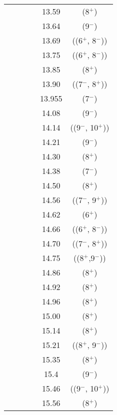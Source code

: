 \begin{center}
\begin{longtable}{cc cc cc}
  &   &   &   & 13.59 & (8$^+$)                   \\
  &   &   &   & 13.64 & (9$^-$)                   \\
  &   &   &   & 13.69 & ((6$^+$, 8$^-$))          \\
  &   &   &   & 13.75 & ((6$^+$, 8$^-$))          \\
  &   &   &   & 13.85 & (8$^+$)                   \\
  &   &   &   & 13.90 & ((7$^-$, 8$^+$))          \\
  &   &   &   & 13.955  & (7$^-$)                   \\
  &   &   &   & 14.08 &   (9$^-$)                 \\
  &   &   &   & 14.14 &   ((9$^-$, 10$^+$))       \\
  &   &   &   & 14.21 &   (9$^-$)                 \\
  &   &   &   & 14.30 &   (8$^+$)                 \\
  &   &   &   & 14.38 &   (7$^-$)                 \\
  &   &   &   & 14.50 &   (8$^+$)                 \\
  &   &   &   & 14.56 &   ((7$^-$, 9$^+$))        \\
  &   &   &   & 14.62 &   (6$^+$)                 \\
  &   &   &   & 14.66 &   ((6$^+$, 8$^-$))        \\
  &   &   &   & 14.70 &   ((7$^-$, 8$^+$))        \\
  &   &   &   & 14.75 &   ((8$^+$,9$^-$))         \\
  &   &   &   & 14.86 &   (8$^+$)                 \\
  &   &   &   & 14.92 &   (8$^+$)                 \\
  &   &   &   & 14.96 &   (8$^+$)                 \\
  &   &   &   & 15.00 &   (8$^+$)                 \\
  &   &   &   & 15.14 &   (8$^+$)                 \\
  &   &   &   & 15.21 &   ((8$^+$, 9$^-$))        \\
  &   &   &   & 15.35 &   (8$^+$)                 \\
  &   &   &   & 15.4  &   (9$^-$)                 \\
  &   &   &   & 15.46 &   ((9$^-$, 10$^+$))       \\
  &   &   &   & 15.56 &   (8$^+$)                 \\

\end{longtable}
\end{center}
